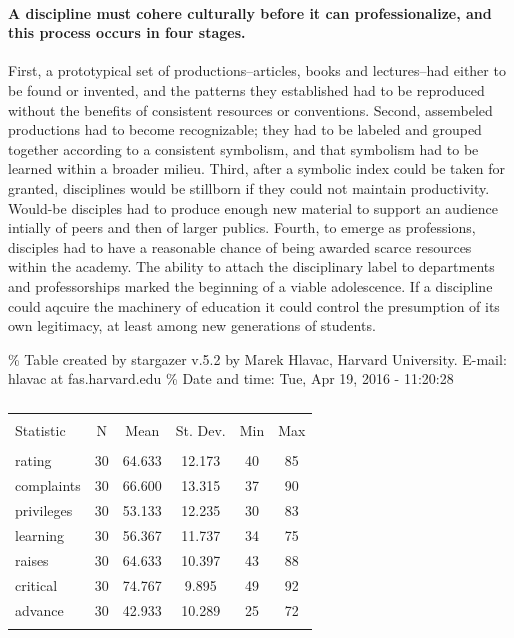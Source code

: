 \documentclass[]{article}
\begin{document}
\paragraph{A discipline must cohere culturally before it can
professionalize, and this process occurs in four
stages.}\label{a-discipline-must-cohere-culturally-before-it-can-professionalize-and-this-process-occurs-in-four-stages.}

First, a prototypical set of productions--articles, books and
lectures--had either to be found or invented, and the patterns they
established had to be reproduced without the benefits of consistent
resources or conventions. Second, assembeled productions had to become
recognizable; they had to be labeled and grouped together according to a
consistent symbolism, and that symbolism had to be learned within a
broader milieu. Third, after a symbolic index could be taken for
granted, disciplines would be stillborn if they could not maintain
productivity. Would-be disciples had to produce enough new material to
support an audience intially of peers and then of larger publics.
Fourth, to emerge as professions, disciples had to have a reasonable
chance of being awarded scarce resources within the academy. The ability
to attach the disciplinary label to departments and professorships
marked the beginning of a viable adolescence. If a discipline could
aqcuire the machinery of education it could control the presumption of
its own legitimacy, at least among new generations of students.

\% Table created by stargazer v.5.2 by Marek Hlavac, Harvard University.
E-mail: hlavac at fas.harvard.edu \% Date and time: Tue, Apr 19, 2016 -
11:20:28

\begin{table}[!htbp] \centering 
  \caption{} 
  \label{} 
\begin{tabular}{@{\extracolsep{5pt}}lccccc} 
\\[-1.8ex]\hline \\[-1.8ex] 
Statistic & \multicolumn{1}{c}{N} & \multicolumn{1}{c}{Mean} & \multicolumn{1}{c}{St. Dev.} & \multicolumn{1}{c}{Min} & \multicolumn{1}{c}{Max} \\ 
\hline \\[-1.8ex] 
rating & 30 & 64.633 & 12.173 & 40 & 85 \\ 
complaints & 30 & 66.600 & 13.315 & 37 & 90 \\ 
privileges & 30 & 53.133 & 12.235 & 30 & 83 \\ 
learning & 30 & 56.367 & 11.737 & 34 & 75 \\ 
raises & 30 & 64.633 & 10.397 & 43 & 88 \\ 
critical & 30 & 74.767 & 9.895 & 49 & 92 \\ 
advance & 30 & 42.933 & 10.289 & 25 & 72 \\ 
\hline \\[-1.8ex] 
\end{tabular} 
\end{table}
\end{document}
